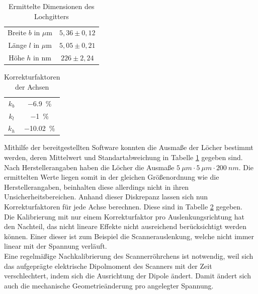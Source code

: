 \begin{table}[t]
    \centering
    \caption{Ermittelte Dimensionen des Lochgitters}
    \begin{tabular}{cc}
    \hline
        Breite $b$ in $\mu$m& $5,36 \pm 0,12$\\
        Länge $l$ in $\mu$m& $5,05 \pm 0,21$\\
        Höhe $h$ in nm& $226 \pm 2,24$\\\hline
    \end{tabular}
    
    \label{tab:lochdim}
\end{table}
\begin{table}[H]
    \centering
    \caption{Korrekturfaktoren der Achsen}
    \begin{tabular}{cc}
    \hline
        $k_b$ & \SI{-6,9}{\%} \\
        $k_l$ &  \SI{-1}{\%}\\
         $k_h$ & \SI{-10,02}{\%}\\\hline
    \end{tabular}
    
    \label{tab:korrs}
\end{table}
Mithilfe der bereitgestellten Software konnten die Ausmaße der Löcher bestimmt werden, deren Mittelwert und Standartabweichung in Tabelle \ref{tab:lochdim} gegeben sind. Nach Herstellerangaben haben die Löcher die Ausmaße $\SI{5}{\mu m} \cdot \SI{5}{\mu m} \cdot \SI{200}{nm}$. Die ermittelten Werte liegen somit in der gleichen Größenordnung wie die Herstellerangaben, beinhalten diese allerdings nicht in ihren Unsicherheitsbereichen. Anhand dieser Diskrepanz lassen sich nun Korrekturfaktoren für jede Achse berechnen. Diese sind in Tabelle \ref{tab:korrs} gegeben.
\\Die Kalibrierung mit nur einem Korrekturfaktor pro Auslenkungsrichtung hat den Nachteil, das nicht lineare Effekte nicht ausreichend berücksichtigt werden können. Einer dieser ist zum Beispiel die Scannerauslenkung, welche nicht immer linear mit der Spannung verläuft. \\Eine regelmäßige Nachkalibrierung des Scannerröhrchens ist notwendig, weil sich das aufgeprägte elektrische Dipolmoment des Scanners mit der Zeit verschlechtert, indem sich die Ausrichtung der Dipole ändert. Damit ändert sich auch die mechanische Geometrieänderung pro angelegter Spannung. 

